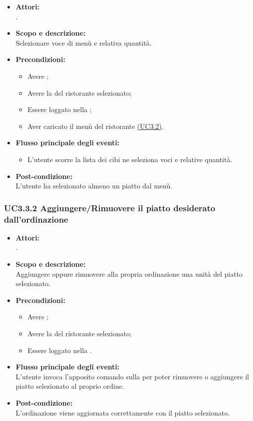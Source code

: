 \begin{itemize}
	\item \textbf{Attori:}
	\\.
	\item \textbf{Scopo e descrizione:} 
	\\Selezionare voce di menù e relativa quantità.
	\item \textbf{Precondizioni:}
	\begin{itemize}
		\item Avere ;
		\item Avere la  del ristorante selezionato;
		\item Essere loggato nella ;
		\item Aver caricato il menù del ristorante \hyperref[UC3.2]{(UC3.2)}.
	\end{itemize}
	\item \textbf{Flusso principale degli eventi:}
	\begin{itemize}
		\item L'utente scorre la lista dei cibi ne seleziona voci e relative quantità.
	\end{itemize}
	\item \textbf{Post-condizione:}
	\\L'utente ha selezionato almeno un piatto dal menù.
\end{itemize}

\subsubsection{UC3.3.2 Aggiungere/Rimuovere il piatto desiderato dall'ordinazione} \label{UC3.3.2}

\begin{itemize}
	\item \textbf{Attori:}
	\\.
	\item \textbf{Scopo e descrizione:} 
	\\Aggiungere oppure rimuovere alla propria ordinazione una unità del piatto selezionato.
	\item \textbf{Precondizioni:}
	\begin{itemize}
		\item Avere ;
		\item Avere la  del ristorante selezionato;
		\item Essere loggato nella .
	\end{itemize}
	\item \textbf{Flusso principale degli eventi:}
	\\L'utente invoca l'apposito comando sulla  per poter rimuovere o aggiungere il piatto selezionato al proprio ordine.
	\item \textbf{Post-condizione:}
	\\L'ordinazione viene aggiornata correttamente con il piatto selezionato.
\end{itemize}

